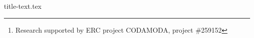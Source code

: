 {title-text.tex}
\author{
        Aggelos Kiayias \and
        Andrew Miller \and
        Dionysis Zindros \fnmsep \thanks{Research supported by ERC project CODAMODA, project \#259152}}
\maketitle
